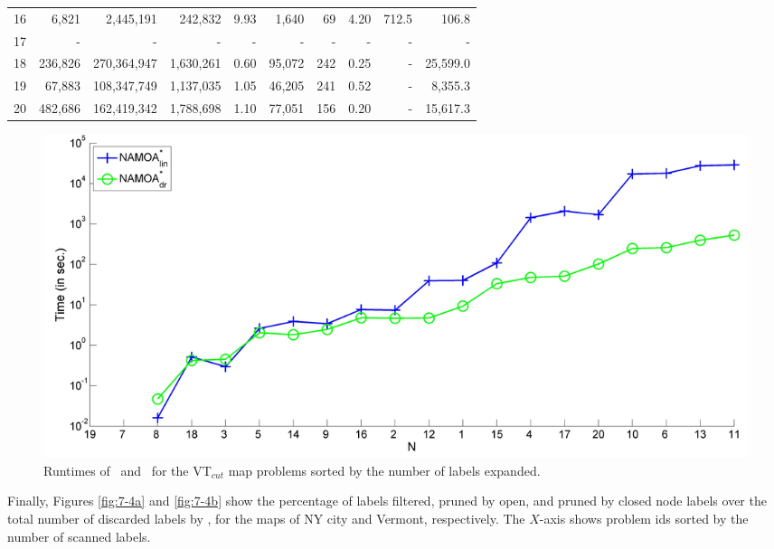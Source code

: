 \begin{table}
\begin{center}
{\begin{tabular}{crrrrrrrrr}
\multicolumn{1}{c}{16} & 6,821 & 2,445,191 & 242,832 & 9.93 & 1,640 & 69 & 4.20 & 712.5 & 106.8 \\
\multicolumn{1}{c}{17} & - & - & - & - & - & - & - & - & - \\
\multicolumn{1}{c}{18} & 236,826 & 270,364,947 & 1,630,261 & 0.60 & 95,072 & 242 & 0.25  & - & 25,599.0 \\
\multicolumn{1}{c}{19} & 67,883 & 108,347,749 & 1,137,035 & 1.05 & 46,205 & 241 & 0.52 & - & 8,355.3 \\
\multicolumn{1}{c}{20} & 482,686 & 162,419,342 & 1,788,698 & 1.10 & 77,051 & 156 & 0.20 & -& 15,617.3 \\
\hline
\end{tabular} 
}
\end{center}
\end{table}

\begin{figure}%
\centering
\includegraphics[width=1\textwidth]{Images/Chapter7/exe-times-VTcut}
\caption{Runtimes of \namoalin \ and \namoate \ for the VT$_{cut}$ map problems sorted by the number of labels expanded.}
\label{fig:7-3}
\end{figure}

Finally, Figures \ref{fig:7-4a} and \ref{fig:7-4b} show the percentage of labels filtered, pruned by open, and pruned by closed node labels over the total number of discarded labels by \namoate, for the maps of NY city and Vermont, respectively. The $X$-axis shows problem ids sorted by the number of scanned labels.

